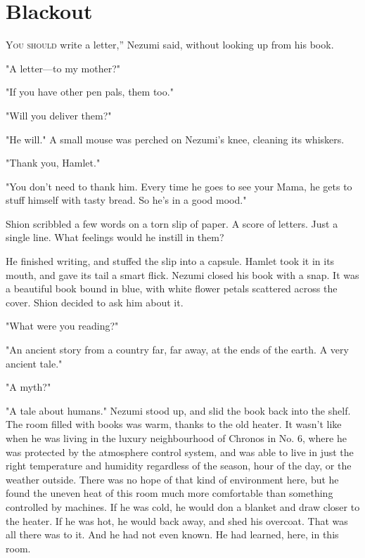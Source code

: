 
\chapter{Blackout}


\lettrine[ante=``]{Y}{ou should} write a letter,'' Nezumi said, without looking up from his
book.

"A letter---to my mother?"

"If you have other pen pals, them too."

"Will you deliver them?"

"He will." A small mouse was perched on Nezumi's knee, cleaning its
whiskers.

"Thank you, Hamlet."

"You don't need to thank him. Every time he goes to see your Mama, he
gets to stuff himself with tasty bread. So he's in a good mood."

Shion scribbled a few words on a torn slip of paper. A score of letters.
Just a single line. What feelings would he instill in them?

He finished writing, and stuffed the slip into a capsule. Hamlet took it
in its mouth, and gave its tail a smart flick. Nezumi closed his book
with a snap. It was a beautiful book bound in blue, with white flower
petals scattered across the cover. Shion decided to ask him about it.

"What were you reading?"

"An ancient story from a country far, far away, at the ends of the
earth. A very ancient tale."

"A myth?"

"A tale about humans." Nezumi stood up, and slid the book back into the
shelf. The room filled with books was warm, thanks to the old heater. It
wasn't like when he was living in the luxury neighbourhood of Chronos in
No. 6, where he was protected by the atmosphere control system, and was
able to live in just the right temperature and humidity regardless of
the season, hour of the day, or the weather outside. There was no hope
of that kind of environment here, but he found the uneven heat of this
room much more comfortable than something controlled by machines. If he
was cold, he would don a blanket and draw closer to the heater. If he
was hot, he would back away, and shed his overcoat. That was all there
was to it. And he had not even known. He had learned, here, in this
room.

